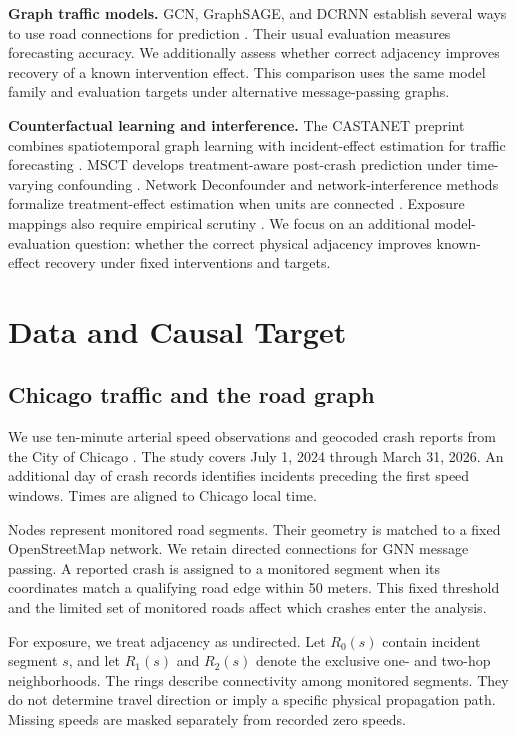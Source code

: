 \documentclass[sigconf,nonacm]{acmart}
\begin{document}
\textbf{Graph traffic models.} GCN, GraphSAGE, and DCRNN establish several ways to use road connections for prediction \cite{kipf2017gcn,hamilton2017graphsage,li2018dcrnn}. Their usual evaluation measures forecasting accuracy. We additionally assess whether correct adjacency improves recovery of a known intervention effect. This comparison uses the same model family and evaluation targets under alternative message-passing graphs.

\textbf{Counterfactual learning and interference.} The CASTANET preprint combines spatiotemporal graph learning with incident-effect estimation for traffic forecasting \cite{kitahara2026castanet}. MSCT develops treatment-aware post-crash prediction under time-varying confounding \cite{li2024msct}. Network Deconfounder and network-interference methods formalize treatment-effect estimation when units are connected \cite{guo2020network,ma2021interference,forastiere2022interference}. Exposure mappings also require empirical scrutiny \cite{huber2026exposure}. We focus on an additional model-evaluation question: whether the correct physical adjacency improves known-effect recovery under fixed interventions and targets.

\section{Data and Causal Target}
\subsection{Chicago traffic and the road graph}
We use ten-minute arterial speed observations and geocoded crash reports from the City of Chicago \cite{chicagoSpeeds,chicagoCrashes}. The study covers July 1, 2024 through March 31, 2026. An additional day of crash records identifies incidents preceding the first speed windows. Times are aligned to Chicago local time.

Nodes represent monitored road segments. Their geometry is matched to a fixed OpenStreetMap network. We retain directed connections for GNN message passing. A reported crash is assigned to a monitored segment when its coordinates match a qualifying road edge within 50 meters. This fixed threshold and the limited set of monitored roads affect which crashes enter the analysis.

For exposure, we treat adjacency as undirected. Let $R_0(s)$ contain incident segment $s$, and let $R_1(s)$ and $R_2(s)$ denote the exclusive one- and two-hop neighborhoods. The rings describe connectivity among monitored segments. They do not determine travel direction or imply a specific physical propagation path. Missing speeds are masked separately from recorded zero speeds.
\end{document}
